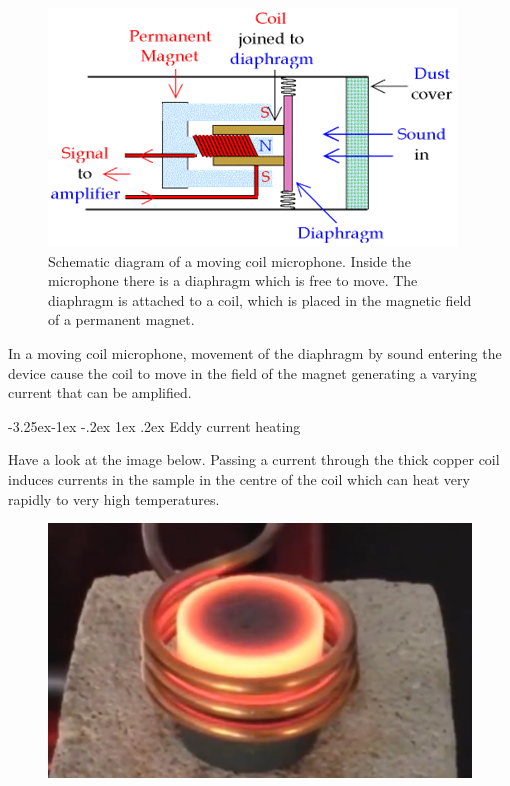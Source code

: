 \documentclass[
]{book}
\makeatletter
\renewcommand\subsection{%
\@startsection{subsection}{2}{\z@}%
              {-3.25ex\@plus -1ex \@minus -.2ex}%
              {1ex \@plus .2ex}%
              {\sffamily\bfseries}}
\numberwithin{equation}{section}
\makeatother
\begin{document}
\begin{figure}

{\centering \includegraphics[width=0.7\linewidth]{Figures/coilMic} 

}

\caption{Schematic diagram of a moving coil microphone. Inside the microphone there is a diaphragm which is free to move. The diaphragm is attached to a coil, which is placed in the magnetic field of a permanent magnet.}\label{fig:coilMic}
\end{figure}

In a moving coil microphone, movement of the diaphragm by sound entering
the device cause the coil to move in the field of the magnet generating
a varying current that can be amplified.

\hypertarget{sec:eddy}{%
\subsection{Eddy current heating}\label{sec:eddy}}

Have a look at the image below. Passing a current through the thick
copper coil induces currents in the sample in the centre of the coil
which can heat very rapidly to very high temperatures.

\begin{figure}

{\centering \includegraphics[width=0.7\linewidth]{Figures/eddyCurHeat} 

}

\end{figure}
\end{document}

